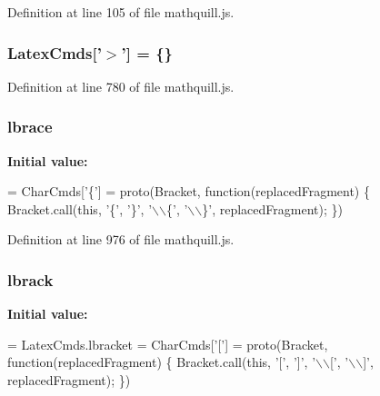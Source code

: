 Definition at line 105 of file mathquill.\-js.

\subsubsection[{Latex\-Cmds}]{\setlength{\rightskip}{0pt plus 5cm}Latex\-Cmds['$>$'] = \{\}}\label{mathquill_8js_a571fcdecd4f82c81c56b09c446c273f0}


Definition at line 780 of file mathquill.\-js.

\subsubsection[{lbrace}]{ lbrace}\label{mathquill_8js_a6ebb98588f659be983737b06a6e5ac30}
{\bfseries Initial value\-:}
\begin{DoxyCode}
= CharCmds[\textcolor{charliteral}{'\{'}] = proto(Bracket, \textcolor{keyword}{function}(replacedFragment) \{
  Bracket.call(\textcolor{keyword}{this}, \textcolor{charliteral}{'\{'}, \textcolor{charliteral}{'\}'}, \textcolor{stringliteral}{'\(\backslash\)\(\backslash\)\{'}, \textcolor{stringliteral}{'\(\backslash\)\(\backslash\)\}'}, replacedFragment);
\})
\end{DoxyCode}


Definition at line 976 of file mathquill.\-js.

\subsubsection[{lbrack}]{ lbrack}\label{mathquill_8js_a983820811e241cdeb411b411eb598057}
{\bfseries Initial value\-:}
\begin{DoxyCode}
= LatexCmds.lbracket = CharCmds[\textcolor{charliteral}{'['}] = proto(Bracket, \textcolor{keyword}{function}(replacedFragment) \{
  Bracket.call(\textcolor{keyword}{this}, \textcolor{charliteral}{'['}, \textcolor{charliteral}{']'}, \textcolor{stringliteral}{'\(\backslash\)\(\backslash\)['}, \textcolor{stringliteral}{'\(\backslash\)\(\backslash\)]'}, replacedFragment);
\})
\end{DoxyCode}


